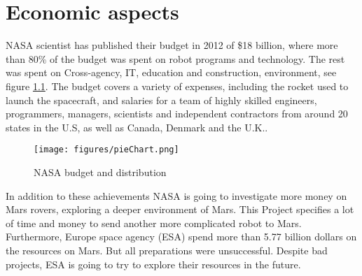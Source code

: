 \chapter{Economic aspects}
NASA scientist has published their budget in 2012 of \$18 billion, where more than 80\% of the budget was spent on robot programs and technology. The rest was spent on Cross-agency, IT, education and construction, environment, see figure \ref{fig:moneypiechartl}.
The budget covers a variety of expenses, including the rocket used to launch the spacecraft, and salaries for a team of highly skilled engineers, programmers, managers, scientists and independent contractors from around 20 states in the U.S, as well as Canada, Denmark and the U.K.\cite{EconomicNASA}.

\begin{figure}[h]
    \centering
    \texttt{[image: figures/pieChart.png]}
    \caption{NASA budget and distribution}
    \label{fig:moneypiechartl} %
\end{figure}

In addition to these achievements NASA is going to investigate more money on Mars rovers, exploring a deeper environment of Mars. This Project specifies a lot of time and money to send another more complicated robot to Mars.
Furthermore, Europe space agency (ESA) spend more than 5.77 billion dollars on the resources on Mars. But all preparations were unsuccessful. Despite bad projects, ESA is going to try to explore their resources in the future\cite{EconomicESA2}\cite{EconomicESA}.
